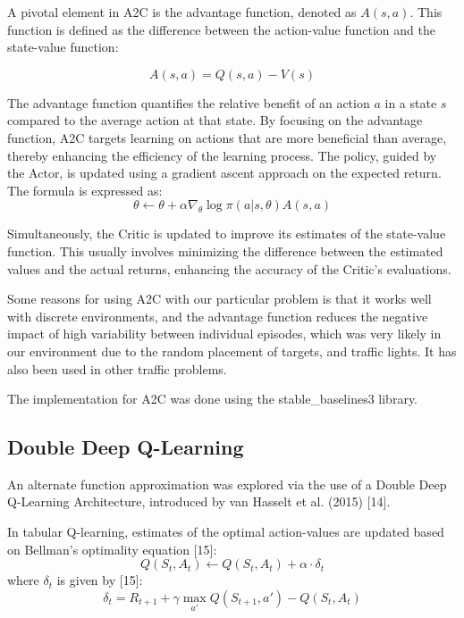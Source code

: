 \documentclass{article}
\begin{document}
	A pivotal element in A2C is the advantage function, denoted as \( A(s, a) \). This function is defined as the difference between the action-value function and the state-value function: 
	
	\begin{equation}
		A(s, a) = Q(s, a) - V(s)
	\end{equation}
	
	The advantage function quantifies the relative benefit of an action \( a \) in a state \( s \) compared to the average action at that state. By focusing on the advantage function, A2C targets learning on actions that are more beneficial than average, thereby enhancing the efficiency of the learning process. The policy, guided by the Actor, is updated using a gradient ascent approach on the expected return. The formula is expressed as: 
	\begin{equation}
		\theta \leftarrow \theta + \alpha \nabla_{\theta} \log \pi(a | s, \theta) A(s, a)
	\end{equation}
	
	Simultaneously, the Critic is updated to improve its estimates of the state-value function. This usually involves minimizing the difference between the estimated values and the actual returns, enhancing the accuracy of the Critic's evaluations.
	
	Some reasons for using A2C with our particular problem is that it works well with discrete environments, and the advantage function reduces the negative impact of high variability between individual episodes, which was very likely in our environment due to the random placement of targets, and traffic lights. It has also been used in other traffic problems.
	
	The implementation for A2C was done using the stable\_baselines3 library.
	
	
	\subsection{Double Deep Q-Learning}
	
	An alternate function approximation was explored via the use of a Double Deep Q-Learning Architecture, introduced by van Hasselt et al. (2015) [14].
	
	In tabular Q-learning, estimates of the optimal action-values are updated based on Bellman's optimality equation [15]:
	\begin{equation}
		Q(S_{t}, A_{t}) \leftarrow Q(S_{t}, A_{t}) + \alpha\cdot\delta_{t}
	\end{equation}
	where $\delta_{t}$ is given by [15]:
	\begin{equation}
		\delta_{t} = R_{t+1} + \gamma\max_{a'}Q(S_{t+1}, a') - Q(S_{t}, A_{t})
	\end{equation}
	
\end{document}

